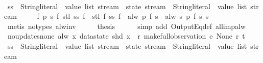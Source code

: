 \begin{isabellebody}
\isamarkupfalse%
\ {\isacharminus}\isanewline
\ \ \isamarkupfalse%
\ ss\ {\isacharcolon}{\isacharcolon}\ {\isachardoublequoteopen}{\isacharparenleft}{\isacharparenleft}String{\isachardot}literal\ {\isasymtimes}\ value\ list{\isacharparenright}\ stream\ {\isasymRightarrow}\ state\ stream{\isacharparenright}\ {\isasymRightarrow}\ {\isacharparenleft}String{\isachardot}literal\ {\isasymtimes}\ value\ list{\isacharparenright}\ stream{\isachardoublequoteclose}\ \isanewline
\ \ \ \ {\isachardoublequoteopen}{\isasymforall}f\ p\ s{\isachardot}\ f\ {\isacharparenleft}stl\ {\isacharparenleft}ss\ f{\isacharparenright}{\isacharparenright}\ {\isasymnoteq}\ stl\ {\isacharparenleft}f\ {\isacharparenleft}ss\ f{\isacharparenright}{\isacharparenright}\ {\isasymor}\ alw\ p\ {\isacharparenleft}f\ s{\isacharparenright}\ {\isacharequal}\ alw\ {\isacharparenleft}{\isasymlambda}s{\isachardot}\ p\ {\isacharparenleft}f\ s{\isacharparenright}{\isacharparenright}\ s{\isachardoublequoteclose}\isanewline
\ \ \ \ \isamarkupfalse%
\ {\isacharparenleft}metis\ {\isacharparenleft}no{\isacharunderscore}types{\isacharparenright}\ alw{\isacharunderscore}inv{\isacharparenright}\isanewline
\ \ \isamarkupfalse%
\ \isamarkupfalse%
\ {\isacharquery}thesis\isanewline
\ \ \ \ \isamarkupfalse%
\ {\isacharparenleft}simp\ add{\isacharcolon}\ OutputEq{\isacharunderscore}def\ all{\isacharunderscore}imp{\isacharunderscore}alw{\isacharparenright}\isanewline
{}\isamarkupfalse%
%
\endisatagproof
{\isafoldproof}%
%
\isadelimproof
\isanewline
%
\endisadelimproof
\isanewline
{}\isamarkupfalse%
\ no{\isacharunderscore}updates{\isacharunderscore}none{\isacharcolon}\ {\isachardoublequoteopen}alw\ {\isacharparenleft}{\isasymlambda}x{\isachardot}\ datastate\ {\isacharparenleft}shd\ x{\isacharparenright}\ {\isacharequal}\ r{\isacharparenright}\ {\isacharparenleft}make{\isacharunderscore}full{\isacharunderscore}observation\ e\ None\ r\ t{\isacharparenright}{\isachardoublequoteclose}\isanewline
%
\isadelimproof
%
\endisadelimproof
%
\isatagproof
{}\isamarkupfalse%
\ {\isacharminus}\isanewline
\ \ \isamarkupfalse%
\ ss\ {\isacharcolon}{\isacharcolon}\ {\isachardoublequoteopen}{\isacharparenleft}{\isacharparenleft}String{\isachardot}literal\ {\isasymtimes}\ value\ list{\isacharparenright}\ stream\ {\isasymRightarrow}\ state\ stream{\isacharparenright}\ {\isasymRightarrow}\ {\isacharparenleft}String{\isachardot}literal\ {\isasymtimes}\ value\ list{\isacharparenright}\ stream{\isachardoublequoteclose}\ \isanewline

\end{isabellebody}
